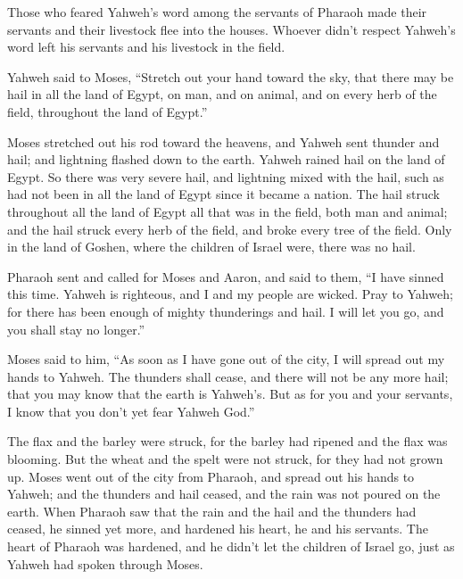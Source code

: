  Those who feared Yahweh's word among the servants of
Pharaoh made their servants and their livestock flee into the houses.
 Whoever didn't respect Yahweh's word left his servants
and his livestock in the field.

 Yahweh said to Moses, ``Stretch out your hand toward the
sky, that there may be hail in all the land of Egypt, on man, and on
animal, and on every herb of the field, throughout the land of Egypt.''

 Moses stretched out his rod toward the heavens, and
Yahweh sent thunder and hail; and lightning flashed down to the earth.
Yahweh rained hail on the land of Egypt.  So there was
very severe hail, and lightning mixed with the hail, such as had not
been in all the land of Egypt since it became a nation. 
The hail struck throughout all the land of Egypt all that was in the
field, both man and animal; and the hail struck every herb of the field,
and broke every tree of the field.  Only in the land of
Goshen, where the children of Israel were, there was no hail.

 Pharaoh sent and called for Moses and Aaron, and said to
them, ``I have sinned this time. Yahweh is righteous, and I and my
people are wicked.  Pray to Yahweh; for there has been
enough of mighty thunderings and hail. I will let you go, and you shall
stay no longer.''

 Moses said to him, ``As soon as I have gone out of the
city, I will spread out my hands to Yahweh. The thunders shall cease,
and there will not be any more hail; that you may know that the earth is
Yahweh's.  But as for you and your servants, I know that
you don't yet fear Yahweh God.''

 The flax and the barley were struck, for the barley had
ripened and the flax was blooming.  But the wheat and the
spelt were not struck, for they had not grown up.  Moses
went out of the city from Pharaoh, and spread out his hands to Yahweh;
and the thunders and hail ceased, and the rain was not poured on the
earth.  When Pharaoh saw that the rain and the hail and
the thunders had ceased, he sinned yet more, and hardened his heart, he
and his servants.  The heart of Pharaoh was hardened, and
he didn't let the children of Israel go, just as Yahweh had spoken
through Moses.

